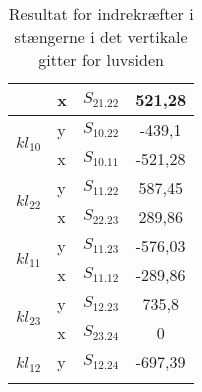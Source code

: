 \begin{table}[htbp]
\begin{tabular}{|c|l|l|c|}
                          & x                  & $S_{21.22}$           & 521,28          \\ \hline
\multirow{2}{*}{$kl_{10}$} & y                  & $S_{10.22}$           & -439,1           \\ \cline{2-4} 
                          & x                  & $S_{10.11}$           & -521,28           \\ \hline
\multirow{2}{*}{$kl_{22}$} & y                  & $S_{11.22}$           & 587,45            \\ \cline{2-4} 
                          & x                  & $S_{22.23}$           & 289,86             \\ \hline
\multirow{2}{*}{$kl_{11}$} & y                  & $S_{11.23}$           & -576,03           \\ \cline{2-4} 
                          & x                  & $S_{11.12}$           & -289,86            \\ \hline
\multirow{2}{*}{$kl_{23}$} & y                  & $S_{12.23}$           & 735,8           \\ \cline{2-4} 
                          & x                  & $S_{23.24}$           & 0                 \\ \hline
\multirow{2}{*}{$kl_{12}$} & y                  & $S_{12.24}$           & -697,39           \\ \cline{2-4} 
                          &                    &                       &                   \\ \hline
\end{tabular}
\caption{Resultat for indrekræfter i stængerne i det vertikale gitter for luvsiden}
\label{tab:Indrekrafterluv}
\end{table}

